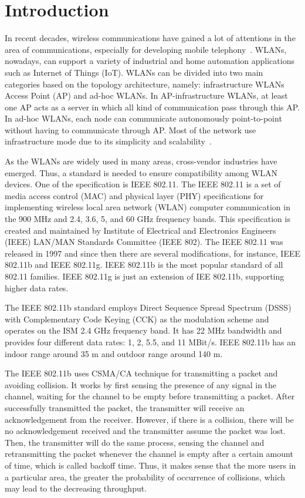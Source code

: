 \chapter{Introduction}

In recent decades, wireless communications have gained a lot of attentions in the area of communications, especially for developing mobile telephony~\cite{athanasopoulos2006evaluation}. WLANs, nowadays, can support a variety of industrial and home automation applications such as Internet of Things (IoT). WLANs can be divided into two main categories based on the topology architecture, namely: infrastructure WLANs Access Point (AP) and ad-hoc WLANs. In AP-infrastructure WLANs, at least one AP acts as a server in which all kind of communication pass through this AP. In ad-hoc WLANs, each node can communicate autonomously point-to-point without having to communicate through AP. Most of the network use infrastructure mode due to its simplicity and scalability~\cite{crow1997ieee}.

As the WLANs are widely used in many areas, cross-vendor industries have emerged. Thus, a standard is needed to ensure compatibility among WLAN devices. One of the specification is  
IEEE 802.11. The IEEE 802.11 is a set of media access control (MAC) and physical layer (PHY) specifications for implementing wireless local area network (WLAN) computer communication in the 900 MHz and 2.4, 3.6, 5, and 60 GHz frequency bands. This specification is created and maintained by Institute of Electrical and Electronics Engineers (IEEE) LAN/MAN Standards Committee (IEEE 802). The IEEE 802.11 was released in 1997 and since then there are several modifications, for instance, IEEE 802.11b and IEEE 802.11g. IEEE 802.11b is the most popular standard of all 802.11 families. IEEE 802.11g is just an extension of IEE 802.11b, supporting higher data rates.

The IEEE 802.11b standard employs Direct Sequence Spread Spectrum (DSSS) with Complementary Code Keying (CCK) as the modulation scheme and operates on the ISM 2.4 GHz frequency band. It has 22 MHz bandwidth and provides four different data rates: 1, 2, 5.5, and 11 MBit/s. IEEE 802.11b has an indoor range around 35 m and outdoor range around 140 m.

The IEEE 802.11b uses CSMA/CA technique for transmitting a packet and avoiding collision. It works by first sensing the presence of any signal in the channel, waiting for the channel to be empty before transmitting a packet. After successfully transmitted the packet, the transmitter will receive an acknowledgement from the receiver. However, if there is a collision, there will be no acknowledgement received and the transmitter assume the packet was lost. Then, the transmitter will do the same process, sensing the channel and retransmitting the packet whenever the channel is empty after a certain amount of time, which is called backoff time. Thus, it makes sense that the more users in a particular area, the greater the probability of occurrence of collisions, which may lead to the decreasing throughput.

